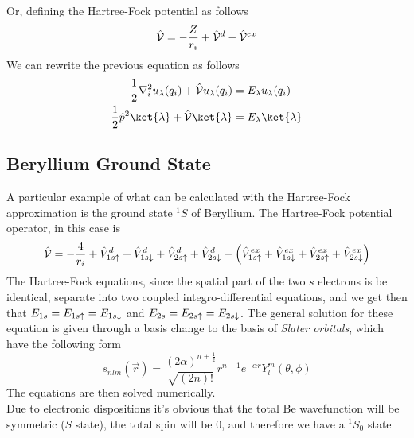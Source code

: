 \documentclass[../qm.tex]{subfiles}
\begin{document}
	Or, defining the Hartree-Fock potential as follows
	\begin{equation}
		\hat{\mathcal{V}}=-\frac{Z}{r_i}+\hat{\mathcal{V}}^d-\hat{\mathcal{V}}^{ex}
		\label{eq:hfpotential}
	\end{equation}
	We can rewrite the previous equation as follows
	\begin{equation}
		\begin{aligned}
			-\frac{1}{2}\nabla_i^2u_{\lambda}(q_i)+\opr{\mathcal{V}}u_{\lambda}(q_i)&=E_{\lambda}u_{\lambda}(q_i)\\
			\frac{1}{2}\opr{p}^2\ket{\lambda}+\opr{\mathcal{V}}\ket{\lambda}&=E_{\lambda}\ket{\lambda}
		\end{aligned}
		\label{eq:hartreefockequationpotentialhf}
	\end{equation}
	\subsection{Beryllium Ground State}
	A particular example of what can be calculated with the Hartree-Fock approximation is the ground state $^1S$ of Beryllium. The Hartree-Fock potential operator, in this case is
	\begin{equation}
		\hat{\mathcal{V}}=-\frac{4}{r_i}+\hat{V}^d_{1s\uparrow}+\hat{V}^d_{1s\downarrow}+\hat{V}^d_{2s\uparrow}+\hat{V}^d_{2s\downarrow}-\left( \hat{V}^{ex}_{1s\uparrow}+\hat{V}^{ex}_{1s\downarrow}+\hat{V}^{ex}_{2s\uparrow}+\hat{V}^{ex}_{2s\downarrow} \right)
		\label{eq:BeHFop}
	\end{equation}
	The Hartree-Fock equations, since the spatial part of the two $s$ electrons is be identical, separate into two coupled integro-differential equations, and we get then that $E_{1s}=E_{1s\uparrow}=E_{1s\downarrow}$ and $E_{2s}=E_{2s\uparrow}=E_{2s\downarrow}$. The general solution for these equation is given through a basis change to the basis of \textit{Slater orbitals}, which have the following form
	\begin{equation}
		s_{nlm}(\vec{r})=\frac{(2\alpha)^{n+\frac{1}{2}}}{\sqrt{(2n)!}}r^{n-1}e^{-\alpha r}Y_{l}^m(\theta,\phi)
		\label{eq:slaterorbitals}
	\end{equation}
	The equations are then solved numerically.\\
	Due to electronic dispositions it's obvious that the total Be wavefunction will be symmetric ($S$ state), the total spin will be $0$, and therefore we have a $^1S_0$ state
\end{document}
